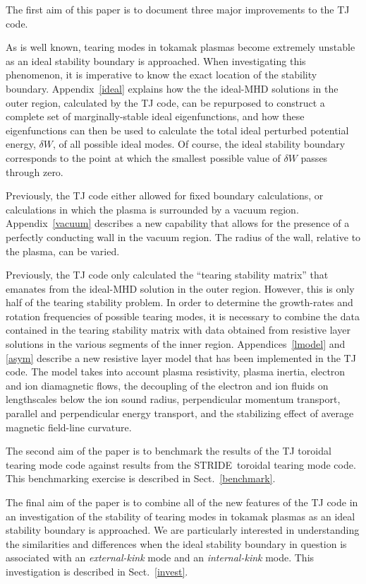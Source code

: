 \documentclass[12pt,prb,aps]{revtex4-1}
\begin{document}
The first aim of this paper is to document three major improvements to the TJ code. 

As is well known, tearing modes in tokamak plasmas become extremely
unstable as an ideal stability boundary is approached.\cite{brennan,bren1,bren2} When investigating this phenomenon, it is imperative to know the exact location
of the  stability boundary. Appendix~\ref{ideal} explains how the the ideal-MHD solutions in the outer region, calculated by the TJ code, can be repurposed to
construct a complete set of marginally-stable ideal eigenfunctions, and how these eigenfunctions can then be used to calculate the total ideal perturbed potential
energy, $\delta W$, of all possible ideal modes.  Of course, the ideal stability boundary corresponds to the point at which the smallest possible value of $\delta W$ passes through
zero.\cite{freidberg,ideal}

Previously, the TJ code either allowed for fixed boundary calculations, or calculations in which the plasma is surrounded by a vacuum region. Appendix~\ref{vacuum} describes a
new capability that allows for the presence of a perfectly conducting wall in the vacuum region. The radius of the wall, relative to the plasma, can be varied. 

Previously, the TJ code only calculated the ``tearing stability matrix'' that emanates from the ideal-MHD solution in the outer region. However, this is only half of the tearing stability problem. 
In order to determine the growth-rates and rotation frequencies of possible tearing modes, it is necessary to combine the data contained in the tearing stability matrix with data obtained from resistive layer solutions
in the various segments of the inner region. Appendices~\ref{lmodel} and \ref{asym}   describe a new resistive layer model that has been implemented in the TJ code. The model takes into account 
plasma resistivity, plasma inertia, electron and ion diamagnetic flows, the decoupling of the electron and ion fluids on lengthscales below the ion sound radius, perpendicular
momentum transport, parallel and perpendicular energy transport, and the stabilizing effect of average magnetic field-line curvature.

The second aim of the paper is to benchmark the results of the TJ toroidal tearing mode code against results from the STRIDE\,\cite{aglas1} toroidal tearing mode code. This benchmarking
exercise is described in Sect.~\ref{benchmark}. 

The final aim of the paper is to combine all of the new features of the TJ code in an investigation of the stability of tearing modes in tokamak plasmas as
an ideal stability boundary is approached. We are particularly interested in understanding the similarities and differences when the ideal stability boundary in question is associated with
an {\em external-kink}\/ mode and an {\em internal-kink}\/ mode. This investigation is described in Sect.~\ref{invest}.
\end{document}
